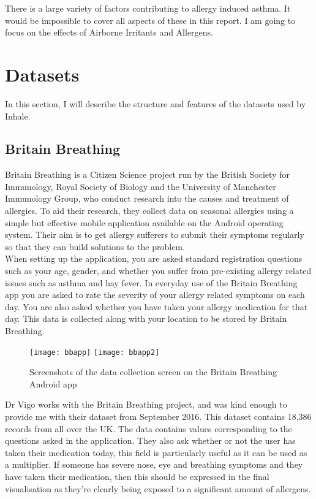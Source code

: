 There is a large variety of factors contributing to allergy induced asthma. It would be impossible to cover all aspects of these in this report. I am going to focus on the effects of Airborne Irritants and Allergens.


\section{Datasets}

In this section, I will describe the structure and features of the datasets used by Inhale.\\

\subsection{Britain Breathing}

Britain Breathing is a Citizen Science project run by the British Society for Immunology, Royal Society of Biology and the University of Manchester Immunology Group, who conduct research into the causes and treatment of allergies. To aid their research, they collect data on seasonal allergies using a simple but effective mobile application available on the Android operating system. Their aim is to get allergy sufferers to submit their symptoms regularly so that they can build solutions to the problem.\\

When setting up the application, you are asked standard registration questions such as your age, gender, and whether you suffer from pre-existing allergy related issues such as asthma and hay fever. In everyday use of the Britain Breathing app you are asked to rate the severity of your allergy related symptoms on each day. You are also asked whether you have taken your allergy medication for that day. This data is collected along with your location to be stored by Britain Breathing.

\begin{figure}[H]
\begin{center}
\texttt{[image: bbapp]}
\texttt{[image: bbapp2]}
\caption{Screenshots of the data collection screen on the Britain Breathing Android app}
\label{fig:bbscrn}
\end{center}
\end{figure}

Dr Vigo works with the Britain Breathing project, and was kind enough to provide me with their dataset from September 2016. This dataset contains 18,386 records from all over the UK. The data contains values corresponding to the questions asked in the application. They also ask whether or not the user has taken their medication today, this field is particularly useful as it can be used as a multiplier. If someone has severe nose, eye and breathing symptoms and they have taken their medication, then this should be expressed in the final visualisation as they're clearly being exposed to a significant amount of allergens.\\%

